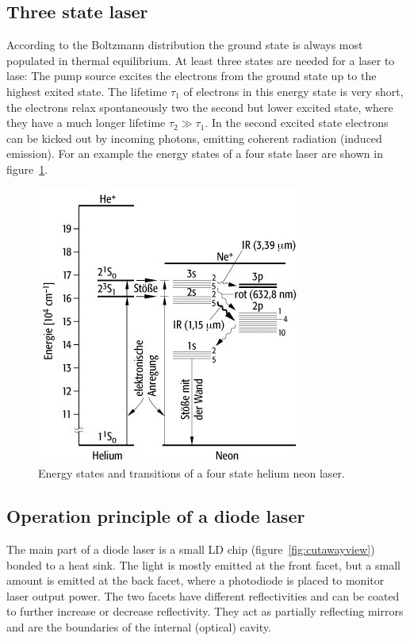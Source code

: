 \subsection{Three state laser}\label{three-state-laser}

According to the Boltzmann distribution the ground state is always most populated in thermal
equilibrium.
At least three states are needed for a laser to lase: The pump source excites the electrons from
the ground state up to the highest exited state.
The lifetime \(\tau_1\) of electrons in this energy state is very short, the electrons relax
spontaneously two the second but lower excited state, where they have a much longer lifetime
\(\tau_2 \gg \tau_1\).
In the second excited state electrons can be kicked out by incoming photons, emitting coherent
radiation (induced emission).
For an example the energy states of a four state laser are shown in
figure~\ref{fig:four_state_laser}.
\begin{figure}[ht]
  \centering
  \includegraphics[width=0.6\linewidth]{content/uebergaenge.jpg}
  \caption{Energy states and transitions of a four state helium neon laser\cite{anleitung_hene}.}%
  \label{fig:four_state_laser}
\end{figure}

\subsection{Operation principle of a diode laser}\label{sub:diode-laser}
The main part of a diode laser is a small LD chip (figure~\ref{fig:cutawayview}) bonded to a heat sink.
The light is mostly emitted at the front facet, but a small amount is emitted at the back facet,
where a photodiode is placed to monitor laser output power.
The two facets have different reflectivities and can be coated to further increase or decrease
reflectivity.
They act as partially reflecting mirrors and are the boundaries of the internal (optical) cavity.

